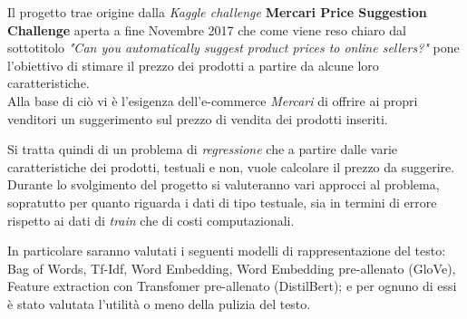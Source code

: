 



Il progetto trae origine dalla \textit{Kaggle challenge} \textbf{Mercari Price
Suggestion Challenge}\cite{mercari-price-suggestion-challenge} aperta a fine
Novembre 2017 che come viene reso chiaro dal sottotitolo \textit{"Can you
automatically suggest product prices to online sellers?"} pone l'obiettivo di
stimare il prezzo dei prodotti a partire da alcune loro caratteristiche. \\
Alla base di ciò vi è l'esigenza dell'e-commerce \textit{Mercari}\cite{mercari}
di offrire ai propri venditori un suggerimento sul prezzo di vendita dei
prodotti inseriti.

Si tratta quindi di un problema di \textit{regressione} che a partire dalle
varie caratteristiche dei prodotti, testuali e non, vuole calcolare il prezzo da
suggerire.
\\
Durante lo svolgimento del progetto si valuteranno vari approcci al problema,
sopratutto per quanto riguarda i dati di tipo testuale, sia in termini di errore
rispetto ai dati di \textit{train} che di costi computazionali.

In particolare saranno valutati i seguenti modelli di rappresentazione del
testo: Bag of Words, Tf-Idf, Word Embedding, Word Embedding pre-allenato (GloVe),
Feature extraction con Transfomer pre-allenato (DistilBert); e per ognuno di
essi è stato valutata l'utilità o meno della pulizia del testo.

